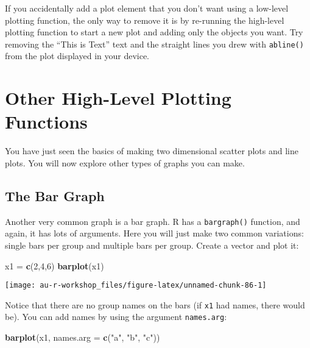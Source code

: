 \documentclass[]{book}
\newenvironment{Shaded}{\begin{snugshade}}{\end{snugshade}}
\newcommand{\KeywordTok}[1]{\textcolor[rgb]{0.13,0.29,0.53}{\textbf{#1}}}
\newcommand{\DataTypeTok}[1]{\textcolor[rgb]{0.13,0.29,0.53}{#1}}
\newcommand{\DecValTok}[1]{\textcolor[rgb]{0.00,0.00,0.81}{#1}}
\newcommand{\StringTok}[1]{\textcolor[rgb]{0.31,0.60,0.02}{#1}}
\newcommand{\NormalTok}[1]{#1}
\theoremstyle{definition}
\theoremstyle{definition}
\theoremstyle{definition}
\theoremstyle{remark}
\begin{document}
If you accidentally add a plot element that you don't want using a
low-level plotting function, the only way to remove it is by re-running
the high-level plotting function to start a new plot and adding only the
objects you want. Try removing the ``This is Text'' text and the
straight lines you drew with \texttt{abline()} from the plot displayed
in your device.

\section{Other High-Level Plotting
Functions}\label{other-high-level-plotting-functions}

You have just seen the basics of making two dimensional scatter plots
and line plots. You will now explore other types of graphs you can make.

\subsection{The Bar Graph}\label{the-bar-graph}

Another very common graph is a bar graph. R has a \texttt{bargraph()}
function, and again, it has lots of arguments. Here you will just make
two common variations: single bars per group and multiple bars per
group. Create a vector and plot it:

\begin{Shaded}
\begin{Highlighting}[]
\NormalTok{x1 =}\StringTok{ }\KeywordTok{c}\NormalTok{(}\DecValTok{2}\NormalTok{,}\DecValTok{4}\NormalTok{,}\DecValTok{6}\NormalTok{)}
\KeywordTok{barplot}\NormalTok{(x1)}
\end{Highlighting}
\end{Shaded}

\begin{center}\texttt{[image: au-r-workshop\_files/figure-latex/unnamed-chunk-86-1]} \end{center}

Notice that there are no group names on the bars (if \texttt{x1} had
names, there would be). You can add names by using the argument
\texttt{names.arg}:

\begin{Shaded}
\begin{Highlighting}[]
\KeywordTok{barplot}\NormalTok{(x1, }\DataTypeTok{names.arg =} \KeywordTok{c}\NormalTok{(}\StringTok{"a"}\NormalTok{, }\StringTok{"b"}\NormalTok{, }\StringTok{"c"}\NormalTok{))}
\end{Highlighting}
\end{Shaded}
\end{document}
